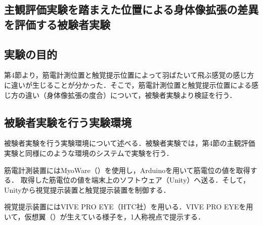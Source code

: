 \begin{small}
      


\section{主観評価実験を踏まえた位置による身体像拡張の差異を評価する被験者実験}
        
  \subsection{実験の目的}
        第4節より，筋電計測位置と触覚提示位置によって羽ばたいて飛ぶ感覚の感じ方に違いが生じることが分かった．そこで，筋電計測位置と触覚提示位置による感じ方の違い（身体像拡張の度合）について，被験者実験より検証を行う．

  \subsection{被験者実験を行う実験環境}





       

        被験者実験を行う実験環境について述べる．被験者実験では，第4節の主観評価実験と同様にのような環境のシステムで実験を行う．

        筋電計測装置にはMyoWare（）を使用し，Arduinoを用いて筋電位の値を取得する．
        取得した筋電位の値を端末上のソフトウェア（Unity）へ送る．そして，Unityから視覚提示装置と触覚提示装置を制御する．

        視覚提示装置にはVIVE PRO EYE（HTC社）\cite{htc-vive}を用いる．VIVE PRO EYEを用いて，仮想翼（）が生えている様子を，1人称視点で提示する．





\end{small}

